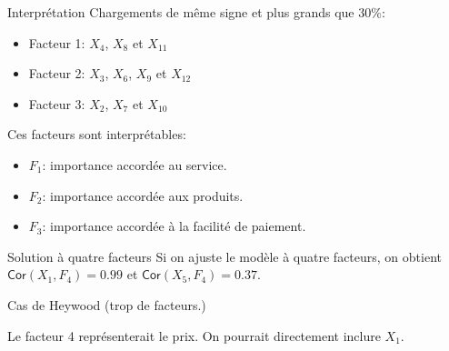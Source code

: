 \documentclass[
  ignorenonframetext,
]{beamer}
\providecommand{\tightlist}{%
  \setlength{\itemsep}{0pt}\setlength{\parskip}{0pt}}\usepackage{longtable,booktabs,array}
\begin{document}
\begin{frame}{Interprétation}
\protect\hypertarget{interpruxe9tation}{}
Chargements de même signe et plus grands que 30\%:

\begin{itemize}
\tightlist
\item
  Facteur 1: \(X_4\), \(X_8\) et \(X_{11}\)
\item
  Facteur 2: \(X_3\), \(X_6\), \(X_9\) et \(X_{12}\)
\item
  Facteur 3: \(X_2\), \(X_7\) et \(X_{10}\)
\end{itemize}

Ces facteurs sont interprétables:

\begin{itemize}
\tightlist
\item
  \(F_1\): importance accordée au service.
\item
  \(F_2\): importance accordée aux produits.
\item
  \(F_3\): importance accordée à la facilité de paiement.
\end{itemize}
\end{frame}

\begin{frame}{Solution à quatre facteurs}
\protect\hypertarget{solution-uxe0-quatre-facteurs}{}
Si on ajuste le modèle à quatre facteurs, on obtient
\(\mathsf{Cor}(X_1, F_4)=0.99\) et \(\mathsf{Cor}(X_5, F_4)=0.37\).

Cas de Heywood (trop de facteurs.)

Le facteur 4 représenterait le prix. On pourrait directement inclure
\(X_1\).
\end{frame}
\end{document}

